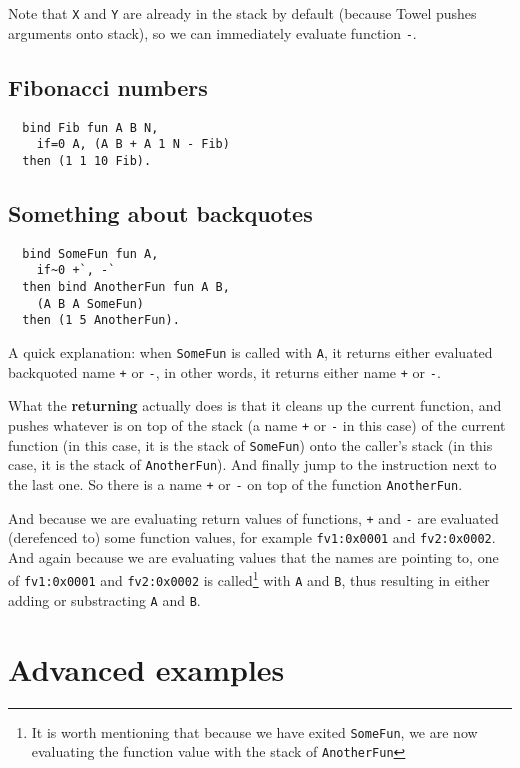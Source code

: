 \documentclass{book}
\begin{document}
Note that \texttt{X} and \texttt{Y} are already in the stack by default (because Towel pushes arguments onto stack), so we can immediately evaluate function \texttt{-}.

\subsection{Fibonacci numbers}
\begin{verbatim}
  bind Fib fun A B N,
    if=0 A, (A B + A 1 N - Fib)
  then (1 1 10 Fib).
\end{verbatim}

\subsection{Something about backquotes}
\begin{verbatim}
  bind SomeFun fun A,
    if~0 +`, -`
  then bind AnotherFun fun A B,
    (A B A SomeFun)
  then (1 5 AnotherFun).
\end{verbatim}

A quick explanation: when \texttt{SomeFun} is called with \texttt{A}, it returns either evaluated backquoted name \texttt{+} or \texttt{-}, in other words, it returns either name \texttt{+} or \texttt{-}.

What the \textbf{returning} actually does is that it cleans up the current function, and pushes whatever is on top of the stack (a name \texttt{+} or \texttt{-} in this case) of the current function (in this case, it is the stack of \texttt{SomeFun}) onto the caller's stack (in this case, it is the stack of \texttt{AnotherFun}). And finally jump to the instruction next to the last one. So there is a name \texttt{+} or \texttt{-} on top of the function \texttt{AnotherFun}.

And because we are evaluating return values of functions, \texttt{+} and \texttt{-} are evaluated (derefenced to) some function values, for example \texttt{fv1:0x0001} and \texttt{fv2:0x0002}. And again because we are evaluating values that the names are pointing to, one of \texttt{fv1:0x0001} and \texttt{fv2:0x0002} is called\footnote{It is worth mentioning that because we have exited \texttt{SomeFun}, we are now evaluating the function value with the stack of \texttt{AnotherFun}} with \texttt{A} and \texttt{B}, thus resulting in either adding or substracting \texttt{A} and \texttt{B}.

\section{Advanced examples}
\end{document}
